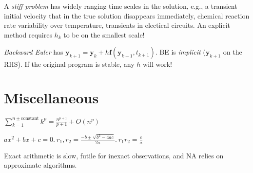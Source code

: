 \documentclass[landscape,10pt,letterpaper]{article}
\newcommand{\heading}[1]{\vspace{-1.5em} \section*{#1} \vspace{-1.0em}}
\begin{document}
\begin{multicols}{4}

A \emph{stiff problem} has widely ranging time scales in the solution, e.g., a transient initial velocity that in the true solution disappears immediately, chemical reaction rate variability over temperature, transients in electical circuits.  An explicit method requires $h_k$ to be on the smallest scale!

\emph{Backward Euler} has $\mathbf{y}_{k+1} = \mathbf{y}_k + h\mathbf{f}(\mathbf{y}_{k+1}, t_{k+1})$.  BE is \emph{implicit} ($\mathbf{y}_{k+1}$ on the RHS).  If the original program is stable, any $h$ will work!

\heading{Miscellaneous}

$\textstyle \sum_{k=1}^{n \pm \mathrm{constant}} k^p = \frac{n^{p+1}}{p+1} + O(n^p)$

$\textstyle ax^2 + bx + c = 0.\ r_1,r_2 = \frac{-b \pm \sqrt{b^2-4ac}}{2a}.\ r_1r_2 = \frac{c}{a}$

Exact arithmetic is slow, futile for inexact observations, and NA relies on approximate algorithms.

\newcommand{\graphboi}[1]{\hspace{-0.25in} \texttt{[image: puzzle/\#1.pdf]}}


\end{multicols}
\end{document}

